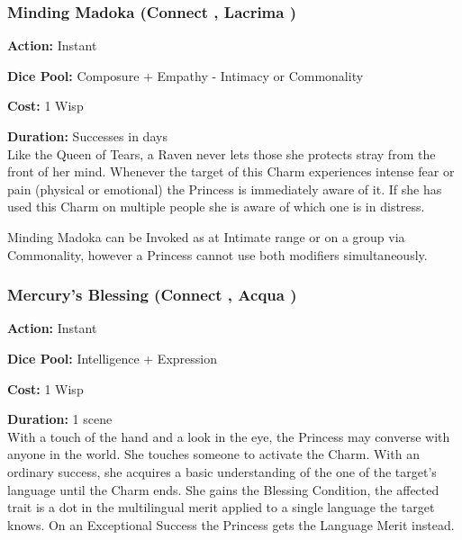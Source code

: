 \subsubsection*{Minding Madoka (Connect \textbullet, Lacrima \textbullet\textbullet)}

\noindent \textbf{Action:} Instant

\noindent \textbf{Dice Pool:} Composure + Empathy - Intimacy or Commonality

\noindent \textbf{Cost:} 1 Wisp

\noindent \textbf{Duration:} Successes in days \\

Like the Queen of Tears, a Raven never lets those she protects stray from the front of her mind. Whenever the target of this Charm experiences intense fear or pain (physical or emotional) the Princess is immediately aware of it. If she has used this Charm on multiple people she is aware of which one is in distress. 

Minding Madoka can be Invoked as at Intimate range or on a group via Commonality, however a Princess cannot use both modifiers simultaneously.	

\subsubsection*{Mercury's Blessing (Connect \textbullet, Acqua \textbullet)}

\noindent \textbf{Action:} Instant

\noindent \textbf{Dice Pool:} Intelligence + Expression

\noindent \textbf{Cost:} 1 Wisp

\noindent \textbf{Duration:} 1 scene \\

\noindent With a touch of the hand and a look in the eye, the Princess may converse with anyone in the world. She touches someone to activate the Charm. With an ordinary success, she acquires a basic understanding of the one of the target's language until the Charm ends. She gains the Blessing Condition, the affected trait is a dot in the multilingual merit applied to a single language the target knows. On an Exceptional Success the Princess gets the Language Merit instead. 

